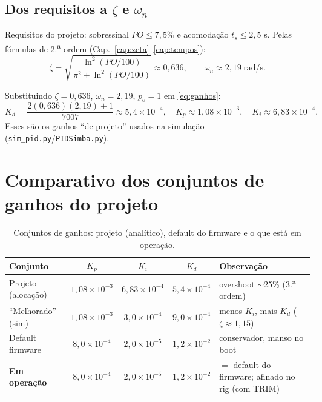 \subsection{Dos requisitos a $\zeta$ e $\omega_n$}
Requisitos do projeto: sobressinal $PO\le 7{,}5\%$ e acomoda\c{c}\~ao
$t_s\le 2{,}5$ s. Pelas f\'ormulas de 2.\textsuperscript{a} ordem (Cap.~\ref{cap:zeta}--\ref{cap:tempos}):
\begin{equation}
\zeta=\sqrt{\frac{\ln^2(PO/100)}{\pi^2+\ln^2(PO/100)}}\approx 0{,}636,
\qquad
\omega_n\approx 2{,}19\ \text{rad/s}.
\end{equation}

\begin{exemplo}[Ganhos resultantes (com $p_o=1$ e $A=7007$)]
Substituindo $\zeta=0{,}636$, $\omega_n=2{,}19$, $p_o=1$ em \eqref{eq:ganhos}:
\[
K_d=\frac{2(0{,}636)(2{,}19)+1}{7007}\approx 5{,}4\times10^{-4},\quad
K_p\approx 1{,}08\times10^{-3},\quad
K_i\approx 6{,}83\times10^{-4}.
\]
Esses s\~ao os ganhos ``de projeto'' usados na simula\c{c}\~ao
(\texttt{sim\_pid.py}/\texttt{PIDSimba.py}).
\end{exemplo}

\section{Comparativo dos conjuntos de ganhos do projeto}
\begin{table}[h]\centering
\caption{Conjuntos de ganhos: projeto (anal\'itico), default do firmware e o que est\'a em opera\c{c}\~ao.}
\label{tab:ganhos}
\small
\begin{tabularx}{\textwidth}{l c c c X}
\toprule
Conjunto & $K_p$ & $K_i$ & $K_d$ & Observa\c{c}\~ao \\
\midrule
Projeto (aloca\c{c}\~ao) & $1{,}08\!\times\!10^{-3}$ & $6{,}83\!\times\!10^{-4}$ & $5{,}4\!\times\!10^{-4}$ & overshoot $\sim$25\% (3.\textsuperscript{a} ordem) \\
``Melhorado'' (sim) & $1{,}08\!\times\!10^{-3}$ & $3{,}0\!\times\!10^{-4}$ & $9{,}0\!\times\!10^{-4}$ & menos $K_i$, mais $K_d$ ($\zeta\!\approx\!1{,}15$) \\
Default firmware & $8{,}0\!\times\!10^{-4}$ & $2{,}0\!\times\!10^{-5}$ & $1{,}2\!\times\!10^{-2}$ & conservador, manso no boot \\
\textbf{Em opera\c{c}\~ao} & $8{,}0\!\times\!10^{-4}$ & $2{,}0\!\times\!10^{-5}$ & $1{,}2\!\times\!10^{-2}$ & $=$ default do firmware; afinado no rig (com TRIM) \\
\bottomrule
\end{tabularx}
\end{table}

